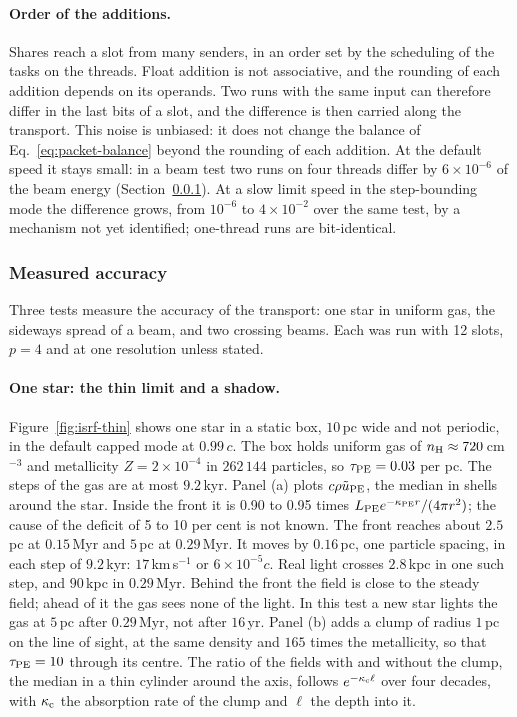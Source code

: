 \paragraph{Order of the additions.} Shares reach a slot from many senders, in
an order set by the scheduling of the tasks on the threads. Float addition is
not associative, and the rounding of each addition depends on its operands.
Two runs with the same input can therefore differ in the last bits of a slot,
and the difference is then carried along the transport. This noise is unbiased: it
does not change the balance of Eq.~\eqref{eq:packet-balance} beyond the
rounding of each addition. At the default speed it stays small: in a beam
test two runs on four threads differ by $6\times10^{-6}$ of the beam energy
(Section~\ref{sec:isrf-accuracy}). At a slow limit speed in the step-bounding
mode the difference grows, from $10^{-6}$ to $4\times10^{-2}$ over the same
test, by a mechanism not yet identified; one-thread runs are bit-identical.

\subsubsection{Measured accuracy}
\label{sec:isrf-accuracy}

Three tests measure the accuracy of the transport: one star in uniform gas, the
sideways spread of a beam, and two crossing beams. Each was run with 12
slots, $p=4$ and at one resolution unless stated.

\paragraph{One star: the thin limit and a shadow.} Figure~\ref{fig:isrf-thin}
shows one star in a static box, $10$\,pc wide and not periodic, in the default
capped mode at $0.99\,c$. The box holds uniform gas of
$n_{\rm H}\approx720$\,cm$^{-3}$ and metallicity $Z=2\times10^{-4}$ in
$262\,144$ particles, so $\tau_{\rm PE}=0.03$ per pc. The steps of the gas are
at most $9.2$\,kyr. Panel (a) plots $c\rho\tilde u_{\rm PE}$, the median in
shells around the star. Inside the front it is 0.90 to 0.95 times
$L_{\rm PE}e^{-\kappa_{\rm PE}r}/(4\pi r^2)$; the cause of the deficit of 5 to
10 per cent is not known. The front reaches about $2.5$\,pc at $0.15$\,Myr and
$5$\,pc at $0.29$\,Myr. It moves by $0.16$\,pc, one particle spacing, in each
step of $9.2$\,kyr: $17$\,km\,s$^{-1}$ or $6\times10^{-5}c$. Real light
crosses $2.8$\,kpc in one such step, and $90$\,kpc in $0.29$\,Myr. Behind the front the field is close to the
steady field; ahead of it the gas sees none of the light. In this test a new
star lights the gas at $5$\,pc after $0.29$\,Myr, not after $16$\,yr.
Panel (b) adds a clump of radius $1$\,pc on the line of sight, at the same
density and $165$ times the metallicity, so that $\tau_{\rm PE}=10$ through its
centre. The ratio of the fields with and without the clump, the median in a
thin cylinder around the axis, follows $e^{-\kappa_{\rm c}\ell}$ over four
decades, with $\kappa_{\rm c}$ the absorption rate of the clump and $\ell$ the
depth into it.

